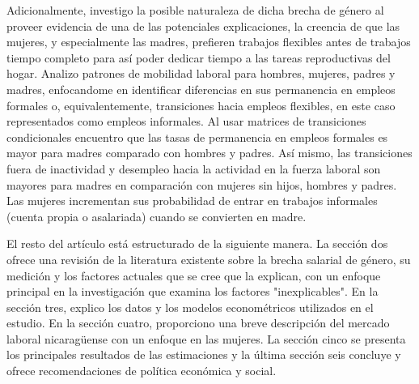 Adicionalmente, investigo la posible naturaleza de dicha brecha de género al proveer evidencia de una de las potenciales explicaciones, la creencia de que las mujeres, y especialmente las madres, prefieren trabajos flexibles antes de trabajos tiempo completo para así poder dedicar tiempo a las tareas reproductivas del hogar. Analizo patrones de mobilidad laboral para hombres, mujeres, padres y madres, enfocandome en identificar diferencias en sus permanencia en empleos formales o, equivalentemente, transiciones hacia empleos flexibles, en este caso representados como empleos informales. Al usar matrices de transiciones condicionales encuentro que las tasas de permanencia en empleos formales es mayor para madres comparado con hombres y padres. Así mismo, las transiciones fuera de inactividad y desempleo hacia la actividad en la fuerza laboral son mayores para madres en comparación con mujeres sin hijos, hombres y padres. Las mujeres incrementan sus probabilidad de entrar en trabajos informales (cuenta propia o asalariada) cuando se convierten en madre. 

El resto del artículo está estructurado de la siguiente manera. La sección dos ofrece una revisión de la literatura existente sobre la brecha salarial de género, su medición y los factores actuales que se cree que la explican, con un enfoque principal en la investigación que examina los factores "inexplicables". En la sección tres, explico los datos y los modelos econométricos utilizados en el estudio. En la sección cuatro, proporciono una breve descripción del mercado laboral nicaragüense con un enfoque en las mujeres. La sección cinco se presenta los principales resultados de las estimaciones y la última sección seis concluye y ofrece recomendaciones de política económica y social.
